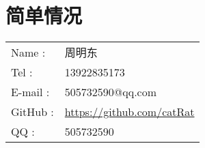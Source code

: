 \section*{简单情况}
\begin{tabular}{ll}
\hline
  Name : & 周明东 \\
  Tel : & 13922835173 \\
  E-mail : & 505732590@qq.com \\
  GitHub : & \url{https://github.com/catRat} \\
  QQ : & 505732590 \\
  \hline
\end{tabular}
